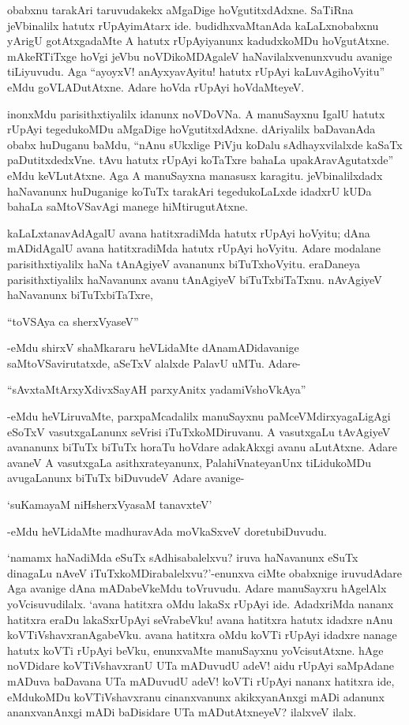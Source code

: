 obabxnu tarakAri taruvudakekx aMgaDige hoVgutitxdAdxne. SaTiRna jeVbinalilx hatutx rUpAyimAtarx ide. budidhxvaMtanAda kaLaLxnobabxnu yArigU gotAtxgadaMte A hatutx rUpAyiyanunx kadudxkoMDu hoVgutAtxne. mAkeRTiTxge hoVgi jeVbu noVDikoMDAgaleV haNavilalxvenunxvudu avanige tiLiyuvudu. Aga ``ayoyxV! anAyxyavAyitu! hatutx rUpAyi kaLuvAgihoVyitu'' eMdu goVLADutAtxne. Adare hoVda rUpAyi hoVdaMteyeV.

inonxMdu parisithxtiyalilx idanunx noVDoVNa. A manuSayxnu IgalU hatutx rUpAyi tegedukoMDu aMgaDige hoVgutitxdAdxne. dAriyalilx baDavanAda obabx huDuganu baMdu, ``nAnu sUkxlige PiVju koDalu sAdhayxvilalxde kaSaTx paDutitxdedxVne. tAvu hatutx rUpAyi koTaTxre bahaLa upakAravAgutatxde'' eMdu keVLutAtxne. Aga A manuSayxna manasusx karagitu. jeVbinalilxdadx haNavanunx huDuganige koTuTx tarakAri tegedukoLaLxde idadxrU kUDa bahaLa saMtoVSavAgi manege hiMtirugutAtxne.

kaLaLxtanavAdAgalU avana hatitxradiMda hatutx rUpAyi hoVyitu; dAna mADidAgalU avana hatitxradiMda hatutx rUpAyi hoVyitu. Adare modalane parisithxtiyalilx haNa tAnAgiyeV avananunx biTuTxhoVyitu. eraDaneya parisithxtiyalilx haNavanunx avanu tAnAgiyeV biTuTxbiTaTxnu. nAvAgiyeV haNavanunx biTuTxbiTaTxre,

\begin{shloka}
``toVSAya ca sherxVyaseV''
\end{shloka}

-eMdu shirxV shaMkararu heVLidaMte dAnamADidavanige saMtoVSavirutatxde, aSeTxV alalxde PalavU uMTu. Adare-

\begin{shloka}
``sAvxtaMtArxyXdivxSayAH parxyAnitx yadamiVshoVkAya''
\end{shloka}

-eMdu heVLiruvaMte, parxpaMcadalilx manuSayxnu paMceVMdirxyagaLigAgi eSoTxV vasutxgaLanunx seVrisi iTuTxkoMDiruvanu. A vasutxgaLu tAvAgiyeV avananunx biTuTx biTuTx horaTu hoVdare adakAkxgi avanu aLutAtxne. Adare avaneV A vasutxgaLa asithxrateyanunx, PalahiVnateyanUnx tiLidukoMDu avugaLanunx biTuTx biDuvudeV Adare avanige-

\begin{shloka}
`suKamayaM niHsherxVyasaM tanavxteV'
\end{shloka}

-eMdu heVLidaMte madhuravAda moVkaSxveV doretubiDuvudu.

`namamx haNadiMda eSuTx sAdhisabalelxvu? iruva haNavanunx eSuTx dinagaLu nAveV iTuTxkoMDirabalelxvu?'-enunxva ciMte obabxnige iruvudAdare Aga avanige dAna mADabeVkeMdu toVruvudu. Adare manuSayxru hAgelAlx yoVcisuvudilalx. `avana hatitxra oMdu lakaSx rUpAyi ide. AdadxriMda nananx hatitxra eraDu lakaSxrUpAyi seVrabeVku! avana hatitxra hatutx idadxre nAnu koVTiVshavxranAgabeVku. avana hatitxra oMdu koVTi rUpAyi idadxre nanage hatutx koVTi rUpAyi beVku, enunxvaMte manuSayxnu yoVcisutAtxne. hAge noVDidare koVTiVshavxranU UTa mADuvudU adeV! aidu rUpAyi saMpAdane mADuva baDavana UTa mADuvudU adeV! koVTi rUpAyi nananx hatitxra ide, eMdukoMDu koVTiVshavxranu cinanxvanunx akikxyanAnxgi mADi adanunx ananxvanAnxgi mADi baDisidare UTa mADutAtxneyeV? ilalxveV ilalx.

